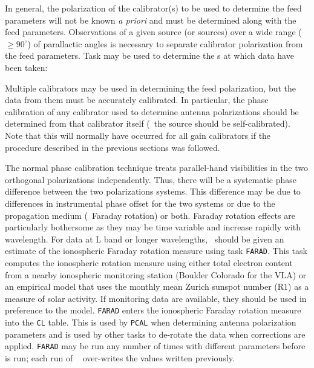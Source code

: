      In general, the polarization of the calibrator(s) to be used to
determine the feed parameters will not be known {\it a priori\/} and
must be determined along with the feed parameters.  Observations of a
given source (or sources) over a wide range ($\ge 90^{\circ}$) of
parallactic angles is necessary to separate calibrator polarization
from the feed parameters.  Task {\tt {}} may be used to
determine the s at which data have been taken:

     Multiple calibrators may be used in determining the feed
polarization, but the data from them must be accurately calibrated.
In particular, the phase calibration of any calibrator used to
determine antenna polarizations should be determined from that
calibrator itself (\ie\ the source should be self-calibrated).  Note
that this will normally have occurred for all gain calibrators if the
procedure described in the previous sections was followed.

     The normal phase calibration technique treats parallel-hand
visibilities in the two orthogonal polarizations independently.  Thus,
there will be a systematic phase difference between the two
polarizations systems.  This difference may be due to differences in
instrumental phase offset for the two systems or due to the
propagation medium (\ie\ Faraday rotation) or both.  Faraday rotation
effects are particularly bothersome as they may be time variable and
increase rapidly with wavelength.  For data at L band or longer
wavelengths, \AIPS\ should be given an estimate of the ionospheric
Faraday rotation measure using task \hbox{{\tt FARAD}}.  This task
computes the ionospheric rotation measure using either total electron
content from a nearby ionospheric monitoring station (Boulder Colorado
for the VLA) or an empirical model that uses the monthly mean Zurich
sunspot number (R1) as a measure of solar activity.  If monitoring
data are available, they should be used in preference to the model.
{\tt FARAD} enters the ionospheric Faraday rotation measure into the
{\tt CL} table.  This is used by {\tt PCAL}  when determining antenna
polarization parameters and is used by other  tasks
to de-rotate the data when  corrections are
applied.  {\tt FARAD} may be run any number of times with different
parameters before {\tt {}} is run; each run of {\tt
{}} over-writes the values written previously.

